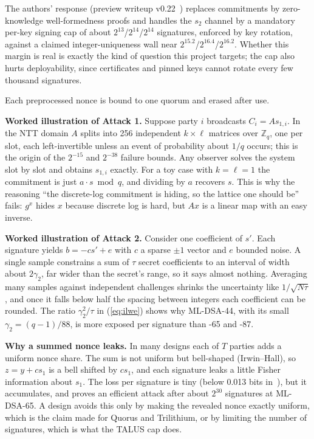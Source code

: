 \documentclass[10pt,conference,a4paper]{IEEEtran}
\begin{document}
The authors' response (preview writeup v0.22~\cite{taluspw}) replaces commitments by zero-knowledge well-formedness
proofs and handles the $s_2$ channel by a mandatory per-key signing cap of about $2^{13}$/$2^{14}$/$2^{14}$ signatures,
enforced by key rotation, against a claimed integer-uniqueness wall near $2^{15.2}$/$2^{16.4}$/$2^{16.2}$. Whether this
margin is real is exactly the kind of question this project targets; the cap also hurts deployability, since
certificates and pinned keys cannot rotate every few thousand signatures.

Each preprocessed nonce is bound to one quorum and erased after use.

\textbf{Worked illustration of Attack 1.} Suppose party $i$ broadcasts $C_i=As_{1,i}$. In the NTT domain $A$ splits into
256 independent $k\times\ell$ matrices over $\mathbb{Z}_q$, one per slot, each left-invertible unless an event of
probability about $1/q$ occurs; this is the origin of the $2^{-15}$ and $2^{-38}$ failure bounds. Any observer solves the
system slot by slot and obtains $s_{1,i}$ exactly. For a toy case with $k=\ell=1$ the commitment is just $a\cdot s \bmod
q$, and dividing by $a$ recovers $s$. This is why the reasoning ``the discrete-log commitment is hiding, so the lattice
one should be'' fails: $g^x$ hides $x$ because discrete log is hard, but $Ax$ is a linear map with an easy inverse.

\textbf{Worked illustration of Attack 2.} Consider one coefficient of $s'$. Each signature yields $b=-cs'+e$ with $c$ a
sparse $\pm1$ vector and $e$ bounded noise. A single sample constrains a sum of $\tau$ secret coefficients to an
interval of width about $2\gamma_2$, far wider than the secret's range, so it says almost nothing. Averaging many samples
against independent challenges shrinks the uncertainty like $1/\sqrt{N\tau}$, and once it falls below half the spacing
between integers each coefficient can be rounded. The ratio $\gamma_2^2/\tau$ in (\ref{eq:ilwe}) shows why ML-DSA-44, with
its small $\gamma_2=(q-1)/88$, is more exposed per signature than -65 and -87.

\textbf{Why a summed nonce leaks.} In many designs each of $T$ parties adds a uniform nonce share. The sum is not uniform
but bell-shaped (Irwin--Hall), so $z=y+cs_1$ is a bell shifted by $cs_1$, and each signature leaks a little Fisher
information about $s_1$. The loss per signature is tiny (below 0.013 bits in~\cite{kao}), but it accumulates, and
\cite{talus} proves an efficient attack after about $2^{30}$ signatures at ML-DSA-65. A design avoids this only by making
the revealed nonce exactly uniform, which is the claim made for Quorus and Trilithium, or by limiting the number of
signatures, which is what the TALUS cap does.
\end{document}
